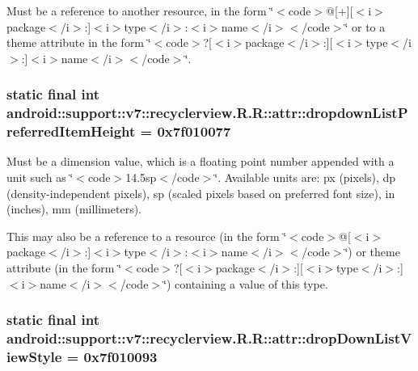 Must be a reference to another resource, in the form \char`\"{}$<$code$>$@\mbox{[}+\mbox{]}\mbox{[}$<$i$>$package$<$/i$>$:\mbox{]}$<$i$>$type$<$/i$>$:$<$i$>$name$<$/i$>$$<$/code$>$\char`\"{} or to a theme attribute in the form \char`\"{}$<$code$>$?\mbox{[}$<$i$>$package$<$/i$>$:\mbox{]}\mbox{[}$<$i$>$type$<$/i$>$:\mbox{]}$<$i$>$name$<$/i$>$$<$/code$>$\char`\"{}. \hypertarget{classandroid_1_1support_1_1v7_1_1recyclerview_1_1_r_1_1attr_266d6860d086a029e07de104e580c063}{
\subsubsection[{dropdownListPreferredItemHeight}]{\setlength{\rightskip}{0pt plus 5cm}static final int android::support::v7::recyclerview.R.R::attr::dropdownListPreferredItemHeight = 0x7f010077}}
\label{classandroid_1_1support_1_1v7_1_1recyclerview_1_1_r_1_1attr_266d6860d086a029e07de104e580c063}


Must be a dimension value, which is a floating point number appended with a unit such as \char`\"{}$<$code$>$14.5sp$<$/code$>$\char`\"{}. Available units are: px (pixels), dp (density-independent pixels), sp (scaled pixels based on preferred font size), in (inches), mm (millimeters). 

This may also be a reference to a resource (in the form \char`\"{}$<$code$>$@\mbox{[}$<$i$>$package$<$/i$>$:\mbox{]}$<$i$>$type$<$/i$>$:$<$i$>$name$<$/i$>$$<$/code$>$\char`\"{}) or theme attribute (in the form \char`\"{}$<$code$>$?\mbox{[}$<$i$>$package$<$/i$>$:\mbox{]}\mbox{[}$<$i$>$type$<$/i$>$:\mbox{]}$<$i$>$name$<$/i$>$$<$/code$>$\char`\"{}) containing a value of this type. \hypertarget{classandroid_1_1support_1_1v7_1_1recyclerview_1_1_r_1_1attr_6b72a3717436585fb0601fd475944674}{
\subsubsection[{dropDownListViewStyle}]{\setlength{\rightskip}{0pt plus 5cm}static final int android::support::v7::recyclerview.R.R::attr::dropDownListViewStyle = 0x7f010093}}
\label{classandroid_1_1support_1_1v7_1_1recyclerview_1_1_r_1_1attr_6b72a3717436585fb0601fd475944674}


